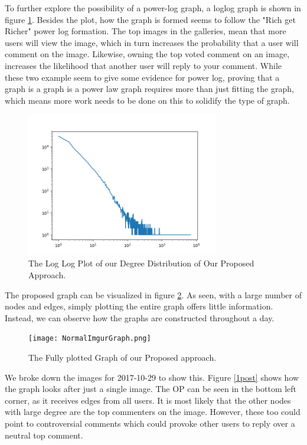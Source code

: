 \documentclass{article}
\begin{document}
\par To further explore the possibility of a power-log graph, a loglog graph is shown in figure \ref{loglogdist}. Besides the plot, how the graph is formed seems to follow the "Rich get Richer" power log formation. The top images in the galleries, mean that more users will view the image, which in turn increases the probability that a user will comment on the image. Likewise, owning the top voted comment on an image, increases the likelihood that another user will reply to your comment. While these two example seem to give some evidence for power log, proving that a graph is a graph is a power law graph requires more than just fitting the graph, which means more work needs to be done on this to solidify the type of graph. 
\begin{figure}[h]
    \centering
    \includegraphics[width=0.75\textwidth]{DegreeDistributionLogLog.png}
    \caption{The Log Log Plot of our Degree Distribution of Our Proposed Approach.}
    \label{loglogdist}
\end{figure}
\par The proposed graph can be visualized in figure \ref{vofNormal}. As seen, with a large number of nodes and edges, simply plotting the entire graph offers little information. Instead, we can observe how the graphs are constructed throughout a day. 
\begin{figure}[h]
    \centering
    \texttt{[image: NormalImgurGraph.png]}
    \caption{The Fully plotted Graph of our Proposed approach.}
    \label{vofNormal}
\end{figure}

We broke down the images for 2017-10-29 to show this. Figure \ref{1post} shows how the graph looks after just a single image. The OP can be seen in the bottom left corner, as it receives edges from all users. It is most likely that the other nodes with large degree are the top commenters on the image. However, these too could point to controversial comments which could provoke other users to reply over a neutral top comment. 
\end{document}
